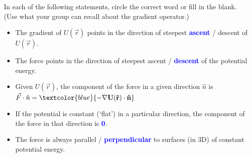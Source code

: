 \documentclass[11pt, letterpaper, openany]{book}
\newenvironment{exercise}[1][Exercise]{%
  \tcolorbox[blanker, breakable, left=1em,
    before skip=1em, after skip=1em,
    borderline west={3pt}{0pt}{PhysNavy},
    colback=PhysCream,
    before upper={\textcolor{PhysNavy}{\sffamily\bfseries #1:}\space}
  ]%
}{%
  \endtcolorbox%
}
\begin{document}
\begin{exercise}[Exercise 2]
In each of the following statements, circle the correct word or fill in the blank. (Use what your group can recall about the gradient operator.)
\begin{itemize}
    \item The gradient of $U(\vec{r})$ points in the direction of steepest \textcolor{blue}{\textbf{ascent}} / descent of $U(\vec{r})$.
    \item The force points in the direction of steepest ascent / \textcolor{blue}{\textbf{descent}} of the potential energy.
    \item Given $U(\vec{r})$, the component of the force in a given direction $\hat{n}$ is $\vec{F} \cdot \hat{n} = \textcolor{blue}{\mathbf{-\nabla U(\vec{r}) \cdot \hat{n}}}$
    \item If the potential is constant (`flat') in a particular direction, the component of the force in that direction is \textcolor{blue}{\textbf{0}}.
    \item The force is always parallel / \textcolor{blue}{\textbf{perpendicular}} to surfaces (in 3D) of constant potential energy.
\end{itemize}
\end{exercise}
\end{document}
